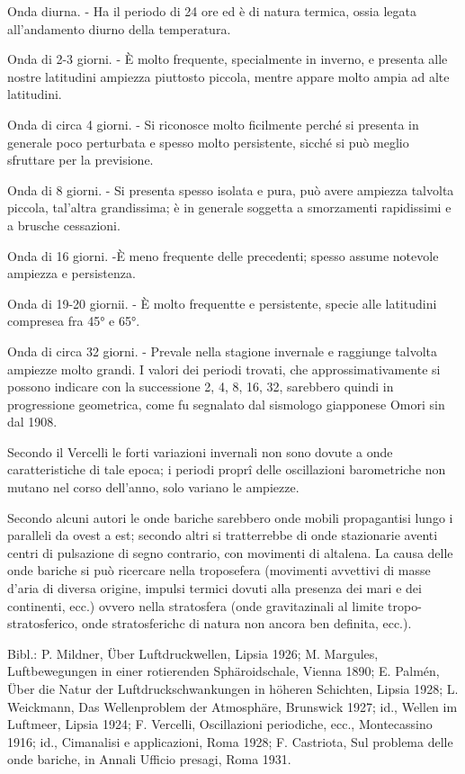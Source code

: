 \documentclass[a4paper]{article}
\begin{document}
Onda diurna. - Ha il periodo di 24 ore ed è di natura termica, ossia legata all'andamento diurno della temperatura.

Onda di 2-3 giorni. - È molto frequente, specialmente in inverno, e presenta alle nostre latitudini ampiezza piuttosto piccola, mentre appare molto ampia ad alte latitudini.

Onda di circa 4 giorni. - Si riconosce molto ficilmente perché si presenta in generale poco perturbata e spesso molto persistente, sicché si può meglio sfruttare per la previsione.

Onda di 8 giorni. - Si presenta spesso isolata e pura, può avere ampiezza talvolta piccola, tal'altra grandissima; è in generale soggetta a smorzamenti rapidissimi e a brusche cessazioni.

Onda di 16 giorni. -È meno frequente delle precedenti; spesso assume notevole ampiezza e persistenza.

Onda di 19-20 giornii. - È molto frequentte e persistente, specie alle latitudini compresea fra 45° e 65°.

Onda di circa 32 giorni. - Prevale nella stagione invernale e raggiunge talvolta ampiezze molto grandi. I valori dei periodi trovati, che approssimativamente si possono indicare con la successione 2, 4, 8, 16, 32, sarebbero quindi in progressione geometrica, come fu segnalato dal sismologo giapponese Omori sin dal 1908.

Secondo il Vercelli le forti variazioni invernali non sono dovute a onde caratteristiche di tale epoca; i periodi proprî delle oscillazioni barometriche non mutano nel corso dell'anno, solo variano le ampiezze.

Secondo alcuni autori le onde bariche sarebbero onde mobili propagantisi lungo i paralleli da ovest a est; secondo altri si tratterrebbe di onde stazionarie aventi centri di pulsazione di segno contrario, con movimenti di altalena. La causa delle onde bariche si può ricercare nella troposefera (movimenti avvettivi di masse d'aria di diversa origine, impulsi termici dovuti alla presenza dei mari e dei continenti, ecc.) ovvero nella stratosfera (onde gravitazinali al limite tropo-stratosferico, onde stratosferichc di natura non ancora ben definita, ecc.).

Bibl.: P. Mildner, Über Luftdruckwellen, Lipsia 1926; M. Margules, Luftbewegungen in einer rotierenden Sphäroidschale, Vienna 1890; E. Palmén, Über die Natur der Luftdruckschwankungen in höheren Schichten, Lipsia 1928; L. Weickmann, Das Wellenproblem der Atmosphäre, Brunswick 1927; id., Wellen im Luftmeer, Lipsia 1924; F. Vercelli, Oscillazioni periodiche, ecc., Montecassino 1916; id., Cimanalisi e applicazioni, Roma 1928; F. Castriota, Sul problema delle onde bariche, in Annali Ufficio presagi, Roma 1931.



\begin{small}
 
\end{small}
\end{document}
